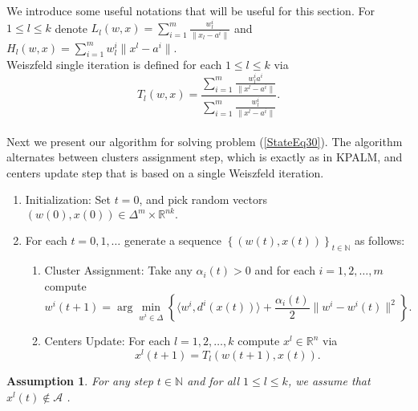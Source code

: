\documentclass[11pt]{article}
\numberwithin{equation}{section}
\newtheorem{assumption}{Assumption}
\begin{document}
We introduce some useful notations that will be useful for this section. 
For $1 \leq l \leq k$ denote $L_l(w,x)= \sum\limits_{i=1}^{m}\frac{w^i_l}{\|x_l - a^i\|}$ and $H_l(w,x)= \sum\limits_{i=1}^{m} w^i_l \|x^l - a^i\|$. \\
Weiszfeld single iteration is defined for each $1 \leq l \leq k$ via
\begin{equation}
T_l(w,x) = \frac{\sum\limits_{i=1}^{m}\frac{w^i_la^i}{\|x^l - a^i\|}}{\sum\limits_{i=1}^{m}\frac{w^i_l}{\|x^l - a^i\|}} . \label{StateEq31}
\end{equation} \\
Next we present our algorithm for solving problem (\ref{StateEq30}).  The algorithm alternates between clusters assignment step, which is exactly as in KPALM, and centers update step that is based on a single Weiszfeld iteration.

\begin{enumerate}[(1)]
	\item Initialization: Set $t=0$, and pick random vectors $(w(0),x(0)) \in \Delta^m \times \mathbb{R}^{nk} .$

	\item For each $t=0,1, \ldots$ generate a sequence $\left\lbrace(w(t),x(t))\right\rbrace_{t \in \mathbb{N}}$ as follows:
	\begin{enumerate}[(2.1)]
		\item Cluster Assignment: Take any $\alpha_i(t) > 0$ and for each $i=1, 2, \ldots ,m$ compute
		\begin{equation}
			w^i(t+1) = \arg\min\limits_{w^i \in \Delta} \left\lbrace \langle w^i , d^i(x(t)) \rangle + \frac{\alpha_i(t)}{2} \|w^i - w^i(t)\|^2 \right\rbrace . \label{StateEq32}
		\end{equation}
		
		\item Centers Update: For each $l=1, 2, \ldots ,k$ compute $x^l \in \mathbb{R}^n$ via
		\begin{equation}
			x^l(t+1) = T_l(w(t+1),x(t)) . \label{StateEq33}
		\end{equation}
	\end{enumerate}
\end{enumerate}

\begin{assumption} \label{StateEq34}
For any step $t \in \mathbb{N}$ and for all $1 \leq l \leq k$, we assume that $x^l(t) \notin \mathcal{A}$ .
\end{assumption}
\end{document}
